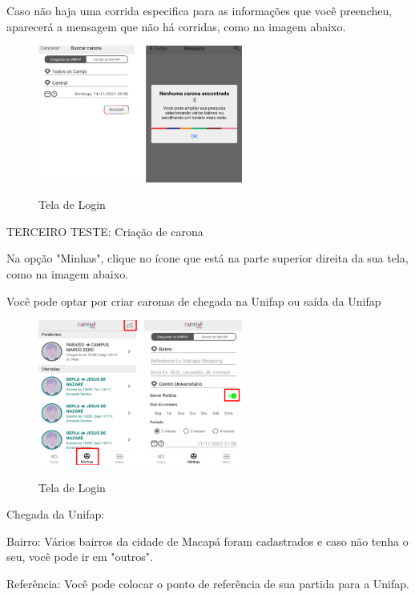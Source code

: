 Caso não haja uma corrida especifica para as informações que você preencheu, aparecerá a mensagem que não há corridas, como na imagem abaixo.

\begin{figure}[H]
	\centering
	\caption{Tela de Login}
	\includegraphics[width=0.6\textwidth]{./04-figuras/manual/buscar_carona.png}
	\label{fig:buscar_carona}
\end{figure}

TERCEIRO TESTE: Criação de carona

Na opção "Minhas", clique no ícone que está na parte superior direita da sua tela, como na imagem abaixo.

Você pode optar por criar caronas de chegada na Unifap ou saída da Unifap

\begin{figure}[H]
	\centering
	\caption{Tela de Login}
	\includegraphics[width=0.6\textwidth]{./04-figuras/manual/criacao_de_carona.png}
	\label{fig:criacao_de_carona}
\end{figure}

Chegada da Unifap:

Bairro: Vários bairros da cidade de Macapá foram cadastrados e caso não tenha o seu,
você pode ir em "outros".

Referência: Você pode colocar o ponto de referência de sua partida para a Unifap.

